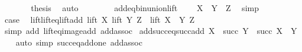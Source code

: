 \begin{isabellebody}
\isanewline
\ \ \ \ \isamarkupfalse%
\ \isamarkupfalse%
\ {\isacharquery}{\kern0pt}thesis\ \isamarkupfalse%
\ auto\isanewline
\ \ \isamarkupfalse%
\isanewline
\ \ \isamarkupfalse%
\ \isamarkupfalse%
\ add{\isacharunderscore}{\kern0pt}eq{\isacharunderscore}{\kern0pt}bin{\isacharunderscore}{\kern0pt}union{\isacharunderscore}{\kern0pt}lift\ \isamarkupfalse%
\ {\isachardoublequoteopen}{\isachardot}{\kern0pt}{\isachardot}{\kern0pt}{\isachardot}{\kern0pt}\ {\isacharequal}{\kern0pt}\ X\ {\isacharplus}{\kern0pt}\ {\isacharparenleft}{\kern0pt}Y\ {\isacharplus}{\kern0pt}\ Z{\isacharparenright}{\kern0pt}{\isachardoublequoteclose}\ \isamarkupfalse%
\ simp\isanewline
\ \ \isamarkupfalse%
\ \isamarkupfalse%
\ {\isacharquery}{\kern0pt}case\ \isacommand{{\isachardot}{\kern0pt}}\isamarkupfalse%
\isanewline
{}\isamarkupfalse%
%
\endisatagproof
{\isafoldproof}%
%
\isadelimproof
\isanewline
%
\endisadelimproof
\isanewline
{}\isamarkupfalse%
\ lift{\isacharunderscore}{\kern0pt}lift{\isacharunderscore}{\kern0pt}eq{\isacharunderscore}{\kern0pt}lift{\isacharunderscore}{\kern0pt}add{\isacharcolon}{\kern0pt}\ {\isachardoublequoteopen}lift\ X\ {\isacharparenleft}{\kern0pt}lift\ Y\ Z{\isacharparenright}{\kern0pt}\ {\isacharequal}{\kern0pt}\ lift\ {\isacharparenleft}{\kern0pt}X\ {\isacharplus}{\kern0pt}\ Y{\isacharparenright}{\kern0pt}\ Z{\isachardoublequoteclose}\isanewline
%
\isadelimproof
\ \ %
\endisadelimproof
%
\isatagproof
{}\isamarkupfalse%
\ {\isacharparenleft}{\kern0pt}simp\ add{\isacharcolon}{\kern0pt}\ lift{\isacharunderscore}{\kern0pt}eq{\isacharunderscore}{\kern0pt}image{\isacharunderscore}{\kern0pt}add\ add{\isacharunderscore}{\kern0pt}assoc{\isacharparenright}{\kern0pt}%
\endisatagproof
{\isafoldproof}%
%
\isadelimproof
\isanewline
%
\endisadelimproof
\isanewline
{}\isamarkupfalse%
\ add{\isacharunderscore}{\kern0pt}succ{\isacharunderscore}{\kern0pt}eq{\isacharunderscore}{\kern0pt}succ{\isacharunderscore}{\kern0pt}add{\isacharcolon}{\kern0pt}\ {\isachardoublequoteopen}X\ {\isacharplus}{\kern0pt}\ succ\ Y\ {\isacharequal}{\kern0pt}\ succ\ {\isacharparenleft}{\kern0pt}X\ {\isacharplus}{\kern0pt}\ Y{\isacharparenright}{\kern0pt}{\isachardoublequoteclose}\isanewline
%
\isadelimproof
\ \ %
\endisadelimproof
%
\isatagproof
{}\isamarkupfalse%
\ {\isacharparenleft}{\kern0pt}auto\ simp{\isacharcolon}{\kern0pt}\ succ{\isacharunderscore}{\kern0pt}eq{\isacharunderscore}{\kern0pt}add{\isacharunderscore}{\kern0pt}one\ add{\isacharunderscore}{\kern0pt}assoc{\isacharparenright}{\kern0pt}%

\end{isabellebody}
